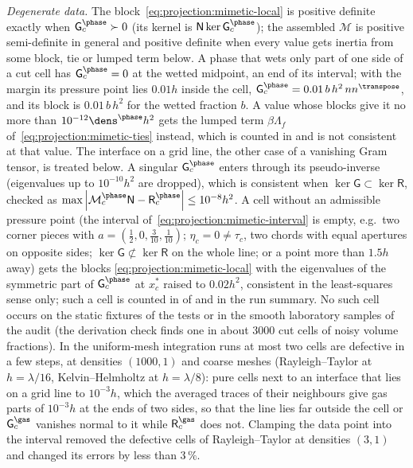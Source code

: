 \emph{Degenerate data.} The block~\cref{eq:projection:mimetic-local} is positive
definite exactly when $\mathsf G^{\phase}_c\succ0$ (its kernel is
$\mathsf N\ker\mathsf G^{\phase}_c$); the assembled $\mathcal M$ is positive
semi-definite in general and positive definite when every value gets inertia
from some block, tie or lumped term below. A phase that wets only part of one
side of a cut cell has $\mathsf G^{\phase}_c=0$ at the wetted midpoint, an end of
its interval; with the margin its pressure point lies $0.01h$ inside the cell,
$\mathsf G^{\phase}_c=0.01\,b\,h^2\,nn^{\transpose}$, and its block is
$0.01\,b\,h^2$ for the wetted fraction $b$. A value whose blocks give it no
more than $10^{-12}\dens^{\phase}h^2$ gets the lumped term $\beta\Lambda_f$
of~\cref{eq:projection:mimetic-ties} instead, which is counted in
 and is not consistent at that value.
The interface on a grid line, the other case of a vanishing Gram tensor, is
treated below. A singular $\mathsf G^{\phase}_c$ enters through its
pseudo-inverse (eigenvalues up to $10^{-10}h^2$ are dropped), which is
consistent when $\ker\mathsf G\subset\ker\mathsf R$, checked as
$\max\abs{\mathcal M^{\phase}_c\mathsf N-\mathsf R^{\phase}_c}\le10^{-8}h^2$. A
cell without an admissible pressure point (the interval
of~\cref{eq:projection:mimetic-interval} is empty, e.g.\ two corner pieces with
$a=(\tfrac12,0,\tfrac3{10},\tfrac1{10})$; $\eta_c=0\ne\tau_c$, two chords with
equal apertures on opposite sides; $\ker\mathsf G\not\subset\ker\mathsf R$ on the
whole line; or a point more than $1.5h$ away) gets the blocks
\cref{eq:projection:mimetic-local} with the eigenvalues of the symmetric part
of $\mathsf G^{\phase}_c$ at $x^{*}_c$ raised to $0.02h^2$, consistent in the
least-squares sense only; such a cell is counted in  of
 and in the run summary. No such cell occurs
on the static fixtures of the tests or in the smooth laboratory samples of
the audit (the derivation check finds one in about 3000 cut cells of noisy
volume fractions). In the uniform-mesh integration runs at most two cells are
defective in a few steps, at densities $(1000,1)$ and coarse meshes
(Rayleigh--Taylor at $h=\lambda/16$, Kelvin--Helmholtz at $h=\lambda/8$): pure
cells next to an interface that lies on a grid line to $10^{-3}h$, which the
averaged traces of their neighbours give gas parts of $10^{-3}h$ at the ends
of two sides, so that the line lies far outside the cell or
$\mathsf G^{\gas}_c$ vanishes normal to it while $\mathsf R^{\gas}_c$ does not.
Clamping the data point into the interval removed the defective cells of
Rayleigh--Taylor at densities $(3,1)$ and changed its errors by less than
$3\,\%$.


